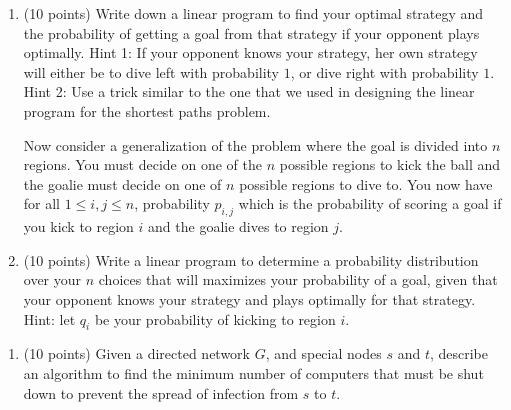 \documentclass[11pt]{article}
\begin{document}
\begin{enumerate}
\begin{enumerate}

\item (10 points) Write down a linear program to find your optimal strategy and the probability of getting a goal from that strategy if your opponent plays optimally.  Hint 1: If your opponent knows your strategy, her own strategy will either be to dive left with probability $1$, or dive right with probability $1$.   Hint 2: Use a trick similar to the one that we used in designing the linear program for the shortest paths problem.  


\pagebreak

Now consider a generalization of the problem where the goal is divided into $n$ regions.  You must decide on one of the $n$ possible regions to kick the ball and the goalie must decide on one of $n$ possible regions to dive to.  You now have for all $1 \leq i,j \leq n$, probability $p_{i,j}$ which is the probability of scoring a goal if you kick to region $i$ and the goalie dives to region $j$.

\item (10 points)   Write a linear program to determine a probability distribution over your $n$ choices that will maximizes your probability of a goal,  given that your opponent knows your strategy and plays optimally for that strategy.  Hint: let $q_{i}$ be your probability of kicking to region $i$.




\end{enumerate}

 
 
 
 \begin{enumerate}
 
A computer $s$ is initially infected with a virus in a directed network and there is a critical computer $t$ that you want to ensure will not become infected.  You are able to shut down any computers except for $s$ and $t$, and you want to prevent infection by shutting down the minimum number of computers such that there is no longer any path from $s$ to $t$.

 \item (10 points) Given a directed network $G$, and special nodes $s$ and $t$, describe an algorithm to find the minimum number of computers that must be shut down to prevent the spread of infection from $s$ to $t$.
 


\end{enumerate}
\end{enumerate}
\end{document}
